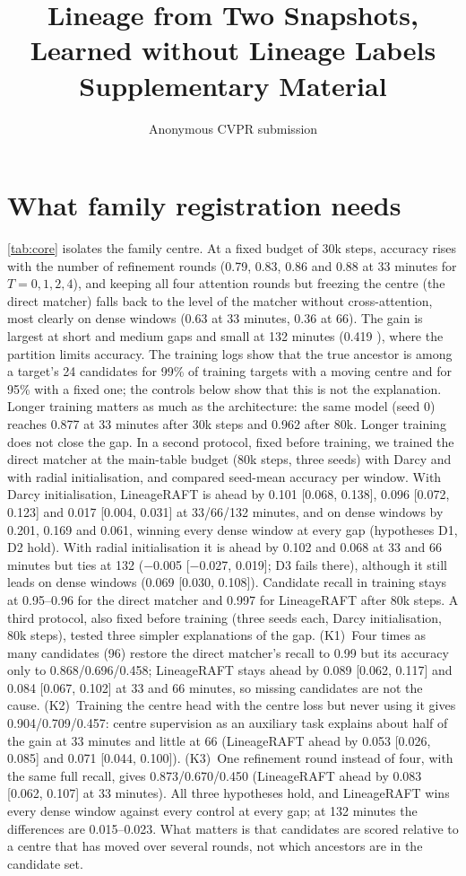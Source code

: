 \documentclass[10pt,twocolumn,letterpaper]{article}
\title{Lineage from Two Snapshots, Learned without Lineage Labels\\Supplementary Material}
\author{Anonymous CVPR submission}
\newcommand{\ours}{LineageRAFT\xspace}
\begin{document}
\maketitle
\appendix



\section{What family registration needs}
\label{sec:core}
\cref{tab:core} isolates the family centre. At a fixed budget of 30k steps, accuracy rises with the number of refinement rounds (0.79, 0.83, 0.86 and 0.88 at 33 minutes for $T{=}0,1,2,4$), and keeping all four attention rounds but freezing the centre (the direct matcher) falls back to the level of the matcher without cross-attention, most clearly on dense windows (0.63  at 33 minutes, 0.36  at 66). The gain is largest at short and medium gaps and small at 132 minutes (0.419 ), where the partition limits accuracy. The training logs show that the true ancestor is among a target's 24 candidates for 99\% of training targets with a moving centre and for 95\% with a fixed one; the controls below show that this is not the explanation. Longer training matters as much as the architecture: the same model (seed 0) reaches 0.877 at 33 minutes after 30k steps and 0.962 after 80k. Longer training does not close the gap. In a second protocol, fixed before training, we trained the direct matcher at the main-table budget (80k steps, three seeds) with Darcy and with radial initialisation, and compared seed-mean accuracy per window. With Darcy initialisation, \ours is ahead by 0.101 [0.068, 0.138], 0.096 [0.072, 0.123] and 0.017 [0.004, 0.031] at 33/66/132 minutes, and on dense windows by 0.201, 0.169 and 0.061, winning every dense window at every gap (hypotheses D1, D2 hold). With radial initialisation it is ahead by 0.102 and 0.068 at 33 and 66 minutes but ties at 132 ($-$0.005 [$-$0.027, 0.019]; D3 fails there), although it still leads on dense windows (0.069 [0.030, 0.108]). Candidate recall in training stays at 0.95--0.96 for the direct matcher and 0.997 for \ours after 80k steps. A third protocol, also fixed before training (three seeds each, Darcy initialisation, 80k steps), tested three simpler explanations of the gap. (K1)~Four times as many candidates (96) restore the direct matcher's recall to 0.99 but its accuracy only to 0.868/0.696/0.458; \ours stays ahead by 0.089 [0.062, 0.117] and 0.084 [0.067, 0.102] at 33 and 66 minutes, so missing candidates are not the cause. (K2)~Training the centre head with the centre loss but never using it gives 0.904/0.709/0.457: centre supervision as an auxiliary task explains about half of the gain at 33 minutes and little at 66 (\ours ahead by 0.053 [0.026, 0.085] and 0.071 [0.044, 0.100]). (K3)~One refinement round instead of four, with the same full recall, gives 0.873/0.670/0.450 (\ours ahead by 0.083 [0.062, 0.107] at 33 minutes). All three hypotheses hold, and \ours wins every dense window against every control at every gap; at 132 minutes the differences are 0.015--0.023. What matters is that candidates are scored relative to a centre that has moved over several rounds, not which ancestors are in the candidate set.

\end{document}
